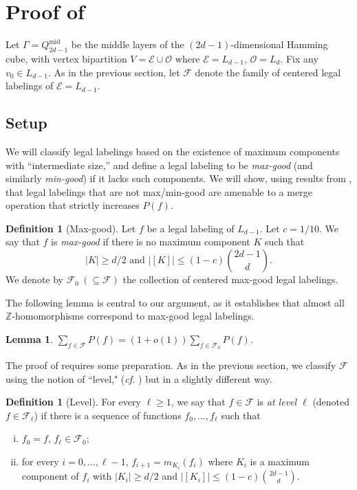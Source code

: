 \documentclass{amsart}
\newtheorem{lem}[thm]{Lemma}
\theoremstyle{definition}
\newtheorem{mydef}[thm]{Definition}
\newcommand{\cO}{\mathcal{O} }
\newcommand{\cE}{\mathcal{E} }
\newcommand{\cF}{\mathcal{F} }
\newcommand{\md}{\mathrm{mid}}
\newcommand{\beq}[1]{\begin{equation}\label{#1}}
\newcommand{\enq}[0]{\end{equation}}
\newcommand{\sub}[0]{\subseteq}
\newcommand{\0}[0]{\emptyset}
\begin{document}
\section{Proof of } \label{sec:proof-middle layers}

Let $\Gamma=Q_{2d-1}^{\md}$ be the middle layers of the $(2d-1)$-dimensional Hamming cube, with vertex bipartition $V=\cE\cup \cO$ where $\cE=L_{d-1}$, $\cO=L_d$. 
Fix any $v_0\in L_{d-1}$. As in the previous section, let $\cF$ denote the family of centered legal labelings of $\cE=L_{d-1}$. 

\subsection{Setup}
We will classify legal labelings based on the existence of maximum components with ``intermediate size,'' and define a legal labeling to be \textit{max-good} (and similarly \textit{min-good}) if it lacks such components. We will show, using results from , that legal labelings that are not max/min-good are amenable to a merge operation that strictly increases $P(f)$.

\begin{mydef}[Max-good]
Let $f$ be a legal labeling of $L_{d-1}$. Let $c=1/10$. We say that $f$ is \textit{max-good} if there is no maximum component $K$ such that
\beq{eq:K_size} \text{$|K|\geq d/2$ and $|[K]|\leq (1-c)\binom{2d-1}{d}$.}\enq
We denote by $\mathcal F_0 ~(\sub \cF)$ the collection of centered max-good legal labelings.
\end{mydef}

The following lemma is central to our argument, as it establishes that almost all $\mathbb Z$-homomorphisms correspond to max-good legal labelings.

\begin{lem}\label{lem:almost-all-good}
$\sum_{f\in\cF}P(f)=(1+o(1))\sum_{f\in\cF_0}P(f)$.
\end{lem}

The proof of  requires some preparation. As in the previous section, we classify $\cF$ using the notion of ``level," (\textit{cf.} ) but in a slightly different way.

\begin{mydef}[Level]
For every $\ell\geq 1$, we say that $f\in\cF$ is \textit{at level $\ell$} (denoted $f \in \cF_\ell$) if there is a sequence of functions $f_0,\dots,f_\ell$ such that
\begin{enumerate}[(i)]
    \item $f_0=f$, $f_\ell\in\cF_0$;
    \item for every $i=0,\dots,\ell-1$, $f_{i+1}=m_{K_i}(f_i)$ where $K_i$ is a maximum component of $f_i$ with $|K_i|\geq d/2$ and $|[K_i]|\leq (1-c)\binom{2d-1}{d}$.
\end{enumerate}
\end{mydef}
\end{document}
